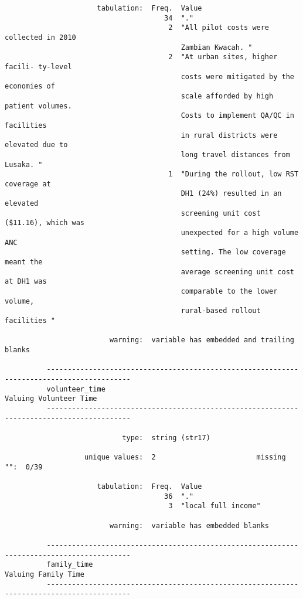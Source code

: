 \documentclass{article}
\begin{document}
\begin{verbatim}
                      tabulation:  Freq.  Value
                                      34  "."
                                       2  "All pilot costs were collected in 2010
                                          Zambian Kwacah. "
                                       2  "At urban sites, higher facili- ty-level
                                          costs were mitigated by the economies of
                                          scale afforded by high patient volumes.
                                          Costs to implement QA/QC in facilities
                                          in rural districts were elevated due to
                                          long travel distances from Lusaka. "
                                       1  "During the rollout, low RST coverage at
                                          DH1 (24%) resulted in an elevated
                                          screening unit cost ($11.16), which was
                                          unexpected for a high volume ANC
                                          setting. The low coverage meant the
                                          average screening unit cost at DH1 was
                                          comparable to the lower volume,
                                          rural-based rollout facilities "
          
                         warning:  variable has embedded and trailing blanks
          
          ------------------------------------------------------------------------------------------
          volunteer_time                                                      Valuing Volunteer Time
          ------------------------------------------------------------------------------------------
          
                            type:  string (str17)
          
                   unique values:  2                        missing "":  0/39
          
                      tabulation:  Freq.  Value
                                      36  "."
                                       3  "local full income"
          
                         warning:  variable has embedded blanks
          
          ------------------------------------------------------------------------------------------
          family_time                                                            Valuing Family Time
          ------------------------------------------------------------------------------------------
          

\end{verbatim}
\end{document}
